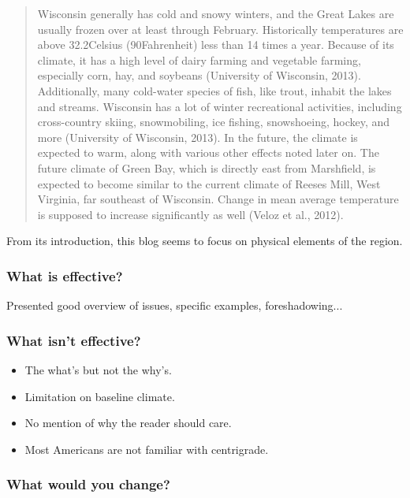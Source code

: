 \documentclass{article}\usepackage[]{graphicx}\usepackage[]{color}
\begin{document}
\begin{quote}
Wisconsin generally has cold and snowy winters, and the Great Lakes are usually frozen over at least through February. Historically temperatures are above 32.2\degree Celsius (90\degree Fahrenheit) less than 14 times a year. Because of its climate, it has a high level of dairy farming and vegetable farming, especially corn, hay, and soybeans (University of Wisconsin, 2013). Additionally, many cold-water species of fish, like trout, inhabit the lakes and streams. Wisconsin has a lot of winter recreational activities, including cross-country skiing, snowmobiling, ice fishing, snowshoeing, hockey, and more (University of Wisconsin, 2013). In the future, the climate is expected to warm, along with various other effects noted later on. The future climate of Green Bay, which is directly east from Marshfield, is expected to become similar to the current climate of Reeses Mill, West Virginia, far southeast of Wisconsin. Change in mean average temperature is supposed to increase significantly as well (Veloz et al., 2012). 
\end{quote}

From its introduction, this blog seems to focus on physical elements of the region.

\subsubsection{What is effective?}

Presented good overview of issues, specific examples, foreshadowing...

\subsubsection{What isn't effective?}

\begin{itemize}
\item The what's but not the why's. 
\item Limitation on baseline climate. 
\item No mention of why the reader should care.
\item Most Americans are not familiar with centrigrade.
\end{itemize}

\subsubsection{What would you change?}
\end{document}
